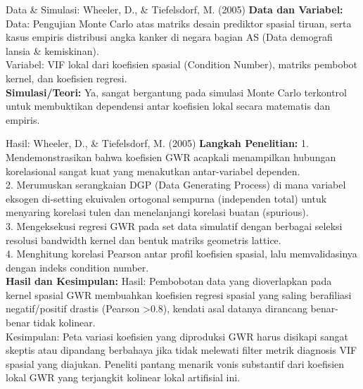 \documentclass{beamer}
\begin{document}
\begin{frame}[allowframebreaks]{Data \& Simulasi: Wheeler, D., \& Tiefelsdorf, M. (2005)}
\textbf{Data dan Variabel:} Data: Pengujian Monte Carlo atas matriks desain prediktor spasial tiruan, serta kasus empiris distribusi angka kanker di negara bagian AS (Data demografi lansia \& kemiskinan).\\ Variabel: VIF lokal dari koefisien spasial (Condition Number), matriks pembobot kernel, dan koefisien regresi. \\[0.3cm]
\textbf{Simulasi/Teori:} Ya, sangat bergantung pada simulasi Monte Carlo terkontrol untuk membuktikan dependensi antar koefisien lokal secara matematis dan empiris.
\end{frame}

\begin{frame}[allowframebreaks]{Hasil: Wheeler, D., \& Tiefelsdorf, M. (2005)}
\textbf{Langkah Penelitian:} 1. Mendemonstrasikan bahwa koefisien GWR acapkali menampilkan hubungan korelasional sangat kuat yang menakutkan antar-variabel dependen.\\ 2. Merumuskan serangkaian DGP (Data Generating Process) di mana variabel eksogen di-setting ekuivalen ortogonal sempurna (independen total) untuk menyaring korelasi tulen dan menelanjangi korelasi buatan (spurious).\\ 3. Mengeksekusi regresi GWR pada set data simulatif dengan berbagai seleksi resolusi bandwidth kernel dan bentuk matriks geometris lattice.\\ 4. Menghitung korelasi Pearson antar profil koefisien spasial, lalu memvalidasinya dengan indeks condition number. \\[0.3cm]
\textbf{Hasil dan Kesimpulan:} Hasil: Pembobotan data yang dioverlapkan pada kernel spasial GWR membuahkan koefisien regresi spasial yang saling berafiliasi negatif/positif drastis (Pearson >0.8), kendati asal datanya dirancang benar-benar tidak kolinear.\\ Kesimpulan: Peta variasi koefisien yang diproduksi GWR harus disikapi sangat skeptis atau dipandang berbahaya jika tidak melewati filter metrik diagnosis VIF spasial yang diajukan. Peneliti pantang menarik vonis substantif dari koefisien lokal GWR yang terjangkit kolinear lokal artifisial ini.
\end{frame}
\end{document}

